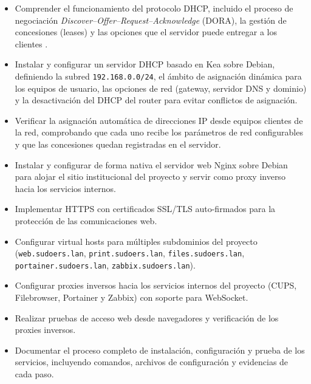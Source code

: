 \begin{itemize}
  \item Comprender el funcionamiento del protocolo DHCP, incluido el proceso
        de negociación \textit{Discover–Offer–Request–Acknowledge} (DORA), la
        gestión de concesiones (leases) y las opciones que el servidor puede
        entregar a los clientes \cite{droms1997,rfc2131}.
  \item Instalar y configurar un servidor DHCP basado en Kea sobre Debian,
        definiendo la subred \texttt{192.168.0.0/24}, el ámbito de
        asignación dinámica para los equipos de usuario, las opciones de red
        (gateway, servidor DNS y dominio) y la desactivación del DHCP del
        router para evitar conflictos de asignación.
  \item Verificar la asignación automática de direcciones IP desde equipos
        clientes de la red, comprobando que cada uno recibe los parámetros de
        red configurables y que las concesiones quedan registradas en el
        servidor.
  \item Instalar y configurar de forma nativa el servidor web Nginx sobre
        Debian para alojar el sitio institucional del proyecto y servir como
        proxy inverso hacia los servicios internos.
  \item Implementar HTTPS con certificados SSL/TLS auto-firmados para la
        protección de las comunicaciones web.
  \item Configurar virtual hosts para múltiples subdominios del proyecto
        (\texttt{web.sudoers.lan}, \texttt{print.sudoers.lan},
        \texttt{files.sudoers.lan}, \texttt{portainer.sudoers.lan},
        \texttt{zabbix.sudoers.lan}).
  \item Configurar proxies inversos hacia los servicios internos del proyecto
        (CUPS, Filebrowser, Portainer y Zabbix) con soporte para WebSocket.
  \item Realizar pruebas de acceso web desde navegadores y verificación de
        los proxies inversos.
  \item Documentar el proceso completo de instalación, configuración y prueba
        de los servicios, incluyendo comandos, archivos de configuración y
        evidencias de cada paso.
\end{itemize}